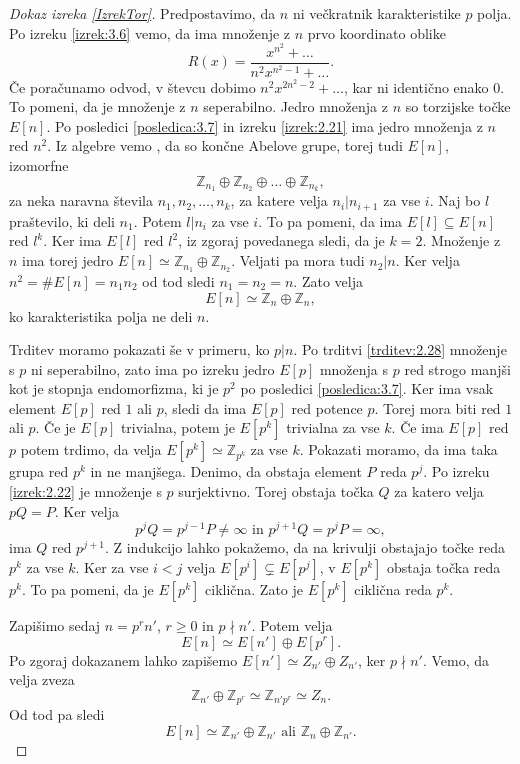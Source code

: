 \documentclass[12pt,a4paper,twoside]{article}
\theoremstyle{definition} %
\theoremstyle{plain} %
\numberwithin{equation}{section}  %
\newcommand{\Z}{\mathbb Z}
\begin{document}
\begin{proof}[Dokaz izreka \ref{IzrekTor}]
Predpostavimo, da $n$ ni večkratnik karakteristike $p$ polja. Po izreku \ref{izrek:3.6} vemo, da ima množenje z $n$ prvo koordinato oblike
$$R(x) = \frac{x^{n^2}+\ldots}{n^2x^{n^2-1}+ \ldots}.$$
Če poračunamo odvod, v števcu dobimo $n^2x^{2n^2-2}+ \ldots$, kar ni identično enako $0$. To pomeni, da je množenje z $n$ seperabilno. Jedro množenja z $n$ so torzijske točke $E[n]$. Po posledici \ref{posledica:3.7} in izreku \ref{izrek:2.21} ima jedro množenja z $n$ red $n^2$. Iz algebre vemo \cite{predavanja}, da so končne Abelove grupe, torej tudi  $E[n]$, izomorfne
$$\Z_{n_1} \oplus \Z_{n_2} \oplus \ldots \oplus \Z_{n_k},$$
za neka naravna števila $n_1,n_2,\ldots,n_k$, za katere velja $n_i|n_{i+1}$  za vse $i$. Naj bo $l$ praštevilo, ki deli $n_1$. Potem $l|n_i$ za vse $i$. To pa pomeni, da ima $E[l] \subseteq E[n]$ red $l^k$. Ker ima $E[l]$ red $l^2$, iz zgoraj povedanega sledi, da je $k=2$. Množenje z $n$ ima torej jedro $E[n] \simeq \Z_{n_1} \oplus \Z_{n_2}$. Veljati pa mora tudi $n_2|n$. Ker velja $n^2=\#E[n] = n_1n_2$ od tod sledi $n_1=n_2=n$. Zato velja
$$E[n] \simeq \Z_n \oplus \Z_n,$$
ko karakteristika polja ne deli $n$.

Trditev moramo pokazati še v primeru, ko $p|n$. Po trditvi \ref{trditev:2.28} množenje s $p$ ni seperabilno, zato ima po izreku \cite{izrek:2.21} jedro $E[p]$ množenja s $p$ red strogo manjši kot je stopnja endomorfizma, ki je $p^2$ po posledici \ref{posledica:3.7}. Ker ima vsak element $E[p]$ red $1$ ali $p$, sledi da ima $E[p]$ red potence $p$. Torej mora biti red $1$ ali $p$. Če je $E[p]$ trivialna, potem je $E[p^k]$ trivialna za vse $k$. Če ima $E[p]$ red $p$ potem trdimo, da velja $E[p^k] \simeq \Z_{p ^k}$ za vse $k$. Pokazati moramo, da ima taka grupa red $p^k$ in ne manjšega. Denimo, da obstaja element $P$ reda $p^j$. Po izreku \ref{izrek:2.22} je množenje s $p$ surjektivno. Torej obstaja točka $Q$ za katero velja $pQ = P$. Ker velja
$$p^jQ = p^{j-1}P \neq \infty \text{ in } p^{j+1}Q = p^jP = \infty,$$
ima $Q$ red $p^{j+1}$. Z indukcijo lahko pokažemo, da na krivulji obstajajo točke reda $p^k$ za vse $k$.
Ker za vse $i < j$ velja $E[p^{i}] \subsetneq E[p^j]$, v $E[p^k]$ obstaja točka reda $p^k$. To pa pomeni, da je $E[p^k]$ ciklična. Zato je $E[p^k]$ ciklična reda $p^k$.

Zapišimo sedaj $n=p^rn'$, $r\geq0$ in $p\nmid n'$. Potem velja
$$E[n] \simeq E[n'] \oplus E[p^r].$$
Po zgoraj dokazanem lahko zapišemo $E[n'] \simeq Z_{n'} \oplus Z_{n'}$, ker $p \nmid n'$. Vemo, da velja zveza
$$\Z_{n'} \oplus \Z_{p^r} \simeq \Z_{n'p^r} \simeq Z_n.$$
Od tod pa sledi
$$E[n] \simeq \Z_{n'} \oplus \Z_{n'} \text{ ali } \Z_n \oplus \Z_{n'}.$$
\end{proof}
\end{document}
